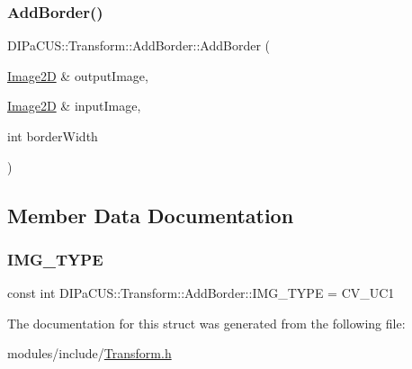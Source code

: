 \subsubsection{\texorpdfstring{Add\+Border()}{AddBorder()}}
{\footnotesize\ttfamily D\+I\+Pa\+C\+U\+S\+::\+Transform\+::\+Add\+Border\+::\+Add\+Border (\begin{DoxyParamCaption}\item[{\mbox{\hyperlink{structDIPaCUS_1_1Transform_1_1AddBorder_afc1095eded4646df5be042cfe0a9c20a}{Image2D}} \&}]{output\+Image,  }\item[{\mbox{\hyperlink{structDIPaCUS_1_1Transform_1_1AddBorder_afc1095eded4646df5be042cfe0a9c20a}{Image2D}} \&}]{input\+Image,  }\item[{int}]{border\+Width }\end{DoxyParamCaption})\hspace{0.3cm}{\ttfamily [inline]}}



\subsection{Member Data Documentation}
\mbox{\label{structDIPaCUS_1_1Transform_1_1AddBorder_a90d789c0649b9c0e299b7ebf374c5c57}} 
\subsubsection{\texorpdfstring{I\+M\+G\+\_\+\+T\+Y\+PE}{IMG\_TYPE}}
{\footnotesize\ttfamily const int D\+I\+Pa\+C\+U\+S\+::\+Transform\+::\+Add\+Border\+::\+I\+M\+G\+\_\+\+T\+Y\+PE = C\+V\+\_\+U\+C1}



The documentation for this struct was generated from the following file\+:\begin{DoxyCompactItemize}
\item 
modules/include/\mbox{\hyperlink{Transform_8h}{Transform.\+h}}\end{DoxyCompactItemize}

